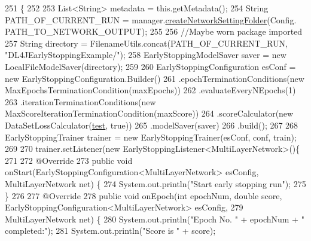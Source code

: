 \begin{DoxyCode}
251                                                                                                            
                                                                                                               \{
252         
253         List<String> metadata = this.getMetadata();
254         String PATH\_OF\_CURRENT\_RUN = manager.\hyperlink{class_neural_network_1_1_export_manager_a682b8d0267d006c5e1c149a09fdd20a7}{createNetworkSettingFolder}(Config.
      PATH\_TO\_NETWORK\_OUTPUT);
255         
256         \textcolor{comment}{//Maybe worn package imported}
257         String directory = FilenameUtils.concat(PATH\_OF\_CURRENT\_RUN, \textcolor{stringliteral}{"DL4JEarlyStoppingExample/"});
258         EarlyStoppingModelSaver saver = \textcolor{keyword}{new} LocalFileModelSaver(directory);
259         
260         EarlyStoppingConfiguration esConf = \textcolor{keyword}{new} EarlyStoppingConfiguration.Builder()
261                 .epochTerminationConditions(\textcolor{keyword}{new} MaxEpochsTerminationCondition(maxEpochs))
262                 .evaluateEveryNEpochs(1)
263                 .iterationTerminationConditions(\textcolor{keyword}{new} MaxScoreIterationTerminationCondition(maxScore))
264                 .scoreCalculator(\textcolor{keyword}{new} DataSetLossCalculator(\hyperlink{class_neural_network_1_1_neural_network_a66774dd8ee622aca4275c19524802726}{test}, \textcolor{keyword}{true}))
265                 .modelSaver(saver)
266                 .build();
267                 
268         EarlyStoppingTrainer trainer = \textcolor{keyword}{new} EarlyStoppingTrainer(esConf, conf, train);
269         
270         trainer.setListener(\textcolor{keyword}{new} EarlyStoppingListener<MultiLayerNetwork>()\{
271 
272             @Override
273             \textcolor{keyword}{public} \textcolor{keywordtype}{void} onStart(EarlyStoppingConfiguration<MultiLayerNetwork> esConfig, MultiLayerNetwork 
      net) \{
274                 System.out.println(\textcolor{stringliteral}{"Start early stopping run"});
275             \}
276             
277             @Override
278             \textcolor{keyword}{public} \textcolor{keywordtype}{void} onEpoch(\textcolor{keywordtype}{int} epochNum, \textcolor{keywordtype}{double} score, EarlyStoppingConfiguration<MultiLayerNetwork> 
      esConfig,
279                     MultiLayerNetwork net) \{
280                 System.out.println(\textcolor{stringliteral}{"Epoch No. "} + epochNum + \textcolor{stringliteral}{" completed:"});
281                 System.out.println(\textcolor{stringliteral}{"Score is "} + score);

\end{DoxyCode}
